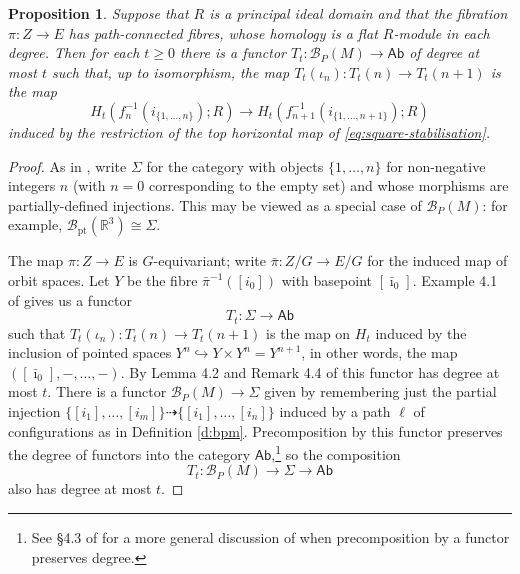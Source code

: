 \documentclass[reqno,a4paper]{article}
\numberwithin{equation}{section}
\theoremstyle{italicised}
\newtheorem{prop}[thm]{Proposition}
\theoremstyle{upright}
\theoremstyle{italicised-restate}
\newcommand{\cB}{\mathcal{B}}
\newcommand{\bR}{\mathbb{R}}
\renewcommand{\geq}{\geqslant}
\begin{document}
\begin{prop}\label{p:twisted-example}
Suppose that $R$ is a principal ideal domain and that the fibration $\pi \colon Z \to E$ has path-connected fibres, whose homology is a flat $R$-module in each degree. Then for each $t \geq 0$ there is a functor $T_t \colon \cB_P(M) \to \mathsf{Ab}$ of degree at most $t$ such that, up to isomorphism, the map $T_t(\iota_n) \colon T_t(n) \to T_t(n+1)$ is the map
\begin{equation}\label{eq:map-of-fibres}
H_t(f_n^{-1}(i_{\{1,\ldots,n\}});R) \longrightarrow H_t(f_{n+1}^{-1}(i_{\{1,\ldots,n+1\}});R)
\end{equation}
induced by the restriction of the top horizontal map of \eqref{eq:square-stabilisation}.
\end{prop}
\begin{proof}
As in \cite{Palmer2018Twistedhomologicalstability}, write $\Sigma$ for the category with objects $\{1,\ldots,n\}$ for non-negative integers $n$ (with $n=0$ corresponding to the empty set) and whose morphisms are partially-defined injections. This may be viewed as a special case of $\cB_P(M)$: for example, $\cB_{\mathrm{pt}}(\bR^3) \cong \Sigma$.

The map $\pi \colon Z \to E$ is $G$-equivariant; write $\bar{\pi} \colon Z/G \to E/G$ for the induced map of orbit spaces. Let $Y$ be the fibre $\bar{\pi}^{-1}([i_0])$ with basepoint $[\bar{\imath}_0]$. Example 4.1 of \cite{Palmer2018Twistedhomologicalstability} gives us a functor
\[
T_t \colon \Sigma \longrightarrow \mathsf{Ab}
\]
such that $T_t(\iota_n) \colon T_t(n) \to T_t(n+1)$ is the map on $H_t$ induced by the inclusion of pointed spaces $Y^n \hookrightarrow Y \times Y^n = Y^{n+1}$, in other words, the map $([\bar{\imath}_0],-,\ldots,-)$. By Lemma 4.2 and Remark 4.4 of \cite{Palmer2018Twistedhomologicalstability} this functor has degree at most $t$. There is a functor $\cB_P(M) \to \Sigma$ given by remembering just the partial injection $\{[i_1],\ldots,[i_m]\} \dashrightarrow \{[i_1],\ldots,[i_n]\}$ induced by a path $\ell$ of configurations as in Definition \ref{d:bpm}. Precomposition by this functor preserves the degree of functors into the category $\mathsf{Ab}$,\footnote{See \S 4.3 of \cite{Palmer2017comparisontwistedcoefficient} for a more general discussion of when precomposition by a functor preserves degree.} so the composition
\[
T_t \colon \cB_P(M) \longrightarrow \Sigma \longrightarrow \mathsf{Ab}
\]
also has degree at most $t$.


\end{proof}
\end{document}
